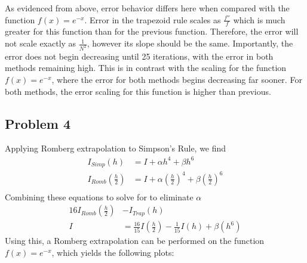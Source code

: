 \documentclass[aps,prb,groupedaddress,nofootinbib,floatfix]{revtex4}
\begin{document}
As evidenced from above, error behavior differs here when compared with the function $f(x)=e^{-x}$. Error in the trapezoid rule scales as $\frac{f''}{f}$ which is much greater for this function than for the previous function. Therefore, the error will not scale exactly as $\frac{1}{N^{2}}$, however its slope should be the same. Importantly, the error does not begin decreasing until 25 iterations, with the error in both methods remaining high. This is in contrast with the scaling for the function $f(x)=e^{-x}$, where the error for both methods begins decreasing far sooner. For both methods, the error scaling for this function is higher than previous.
\subsection*{Problem 4} 
Applying Romberg extrapolation to Simpson's Rule, we find
\begin{align*}
	I_{Simp}(h) & = I + \alpha h^{4} + \beta h^{6}\\
	I_{Romb}(\frac{h}{2}) & = I + \alpha (\frac{h}{2})^{4} + \beta (\frac{h}{2})^{6}\\
\end{align*}
Combining these equations to solve for to eliminate $\alpha$
\begin{align*}
	16I_{Romb}(\frac{h}{2})&-I_{Trap}(h)\\
	I &= \frac{16}{15}I(\frac{h}{2})-\frac{1}{15}I(h)+\beta(h^{6})
\end{align*}
Using this, a Romberg extrapolation can be performed on the function $f(x)=e^{-x}$, which yields the following plots:
\end{document}
